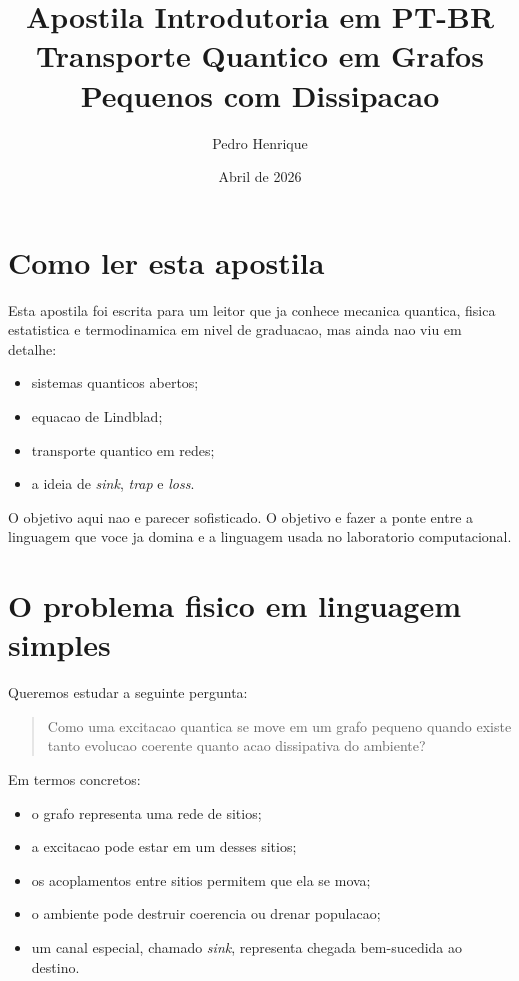 \documentclass[11pt,a4paper]{article}
\title{\textbf{Apostila Introdutoria em PT-BR}\\
\large Transporte Quantico em Grafos Pequenos com Dissipacao}
\author{Pedro Henrique}
\date{Abril de 2026}
\begin{document}
\maketitle
\tableofcontents
\newpage

\section{Como ler esta apostila}

Esta apostila foi escrita para um leitor que ja conhece mecanica quantica,
fisica estatistica e termodinamica em nivel de graduacao, mas ainda nao viu em
detalhe:
\begin{itemize}
  \item sistemas quanticos abertos;
  \item equacao de Lindblad;
  \item transporte quantico em redes;
  \item a ideia de \emph{sink}, \emph{trap} e \emph{loss}.
\end{itemize}

O objetivo aqui nao e parecer sofisticado. O objetivo e fazer a ponte entre a
linguagem que voce ja domina e a linguagem usada no laboratorio computacional.

\section{O problema fisico em linguagem simples}

Queremos estudar a seguinte pergunta:

\begin{quote}
Como uma excitacao quantica se move em um grafo pequeno quando existe tanto
evolucao coerente quanto acao dissipativa do ambiente?
\end{quote}

Em termos concretos:
\begin{itemize}
  \item o grafo representa uma rede de sitios;
  \item a excitacao pode estar em um desses sitios;
  \item os acoplamentos entre sitios permitem que ela se mova;
  \item o ambiente pode destruir coerencia ou drenar populacao;
  \item um canal especial, chamado \emph{sink}, representa chegada bem-sucedida
  ao destino.
\end{itemize}
\end{document}
